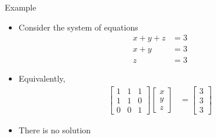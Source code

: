 \documentclass[usenames,dvipsnames,10pt]{beamer}
\begin{document}
\begin{frame}
  {Example}

  \begin{itemize}
  \item Consider the system of equations
    \begin{align*}
      x + y + z &= 3\\
      x+ y &= 3\\
      z &= 3
    \end{align*}
  \item Equivalently,
    \begin{align*}
      \begin{bmatrix} 1 & 1 & 1 \\ 1 & 1 & 0 \\ 0 & 0 & 1\end{bmatrix}\begin{bmatrix} x \\ y \\ z \end{bmatrix} &= \begin{bmatrix} 3 \\ 3 \\ 3 \end{bmatrix}
    \end{align*}
  \item There is no solution
  \end{itemize}

\end{frame}
\end{document}

